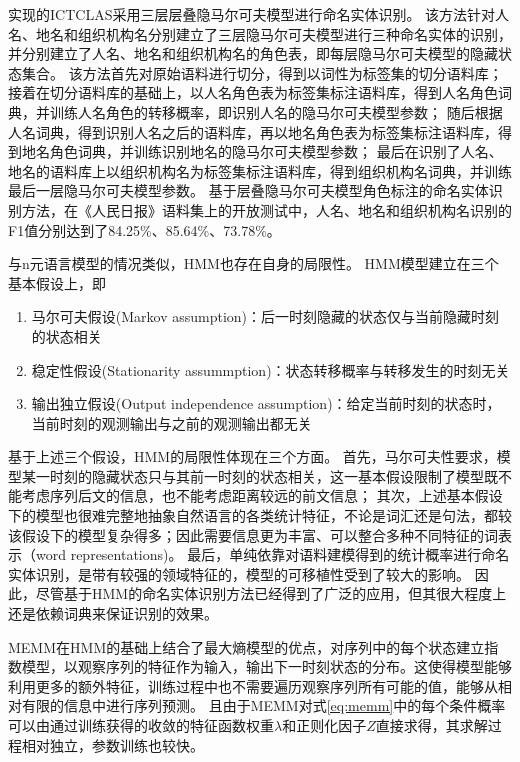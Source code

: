 \citet{张华平2004基于角色标注的中国人名自动识别研究}实现的ICTCLAS采用三层层叠隐马尔可夫模型进行命名实体识别。
该方法针对人名、地名和组织机构名分别建立了三层隐马尔可夫模型进行三种命名实体的识别，并分别建立了人名、地名和组织机构名的角色表，即每层隐马尔可夫模型的隐藏状态集合。
该方法首先对原始语料进行切分，得到以词性为标签集的切分语料库；
接着在切分语料库的基础上，以人名角色表为标签集标注语料库，得到人名角色词典，并训练人名角色的转移概率，即识别人名的隐马尔可夫模型参数；
随后根据人名词典，得到识别人名之后的语料库，再以地名角色表为标签集标注语料库，得到地名角色词典，并训练识别地名的隐马尔可夫模型参数；
最后在识别了人名、地名的语料库上以组织机构名为标签集标注语料库，得到组织机构名词典，并训练最后一层隐马尔可夫模型参数。
基于层叠隐马尔可夫模型角色标注的命名实体识别方法，在《人民日报》语料集上的开放测试中，人名、地名和组织机构名识别的F1值分别达到了84.25\%、85.64\%、73.78\%。

与n元语言模型的情况类似，HMM也存在自身的局限性。
HMM模型建立在三个基本假设上，即
\begin{enumerate}[\indent(1)]
    \item 马尔可夫假设(Markov assumption)：后一时刻隐藏的状态仅与当前隐藏时刻的状态相关
    \item 稳定性假设(Stationarity assummption)：状态转移概率与转移发生的时刻无关
    \item 输出独立假设(Output independence assumption)：给定当前时刻的状态时，当前时刻的观测输出与之前的观测输出都无关
\end{enumerate}
基于上述三个假设，HMM的局限性体现在三个方面。
首先，马尔可夫性要求，模型某一时刻的隐藏状态只与其前一时刻的状态相关，这一基本假设限制了模型既不能考虑序列后文的信息，也不能考虑距离较远的前文信息；
其次，上述基本假设下的模型也很难完整地抽象自然语言的各类统计特征，不论是词汇还是句法，都较该假设下的模型复杂得多；因此需要信息更为丰富、可以整合多种不同特征的词表示（word representations)。
最后，单纯依靠对语料建模得到的统计概率进行命名实体识别，是带有较强的领域特征的，模型的可移植性受到了较大的影响。
因此，尽管基于HMM的命名实体识别方法已经得到了广泛的应用，但其很大程度上还是依赖词典来保证识别的效果。

MEMM在HMM的基础上结合了最大熵模型的优点，对序列中的每个状态建立指数模型，以观察序列的特征作为输入，输出下一时刻状态的分布。这使得模型能够利用更多的额外特征，训练过程中也不需要遍历观察序列所有可能的值，能够从相对有限的信息中进行序列预测。
且由于MEMM对式\ref{eq:memm}中的每个条件概率可以由通过训练获得的收敛的特征函数权重$\lambda$和正则化因子$Z$直接求得，其求解过程相对独立，参数训练也较快。

